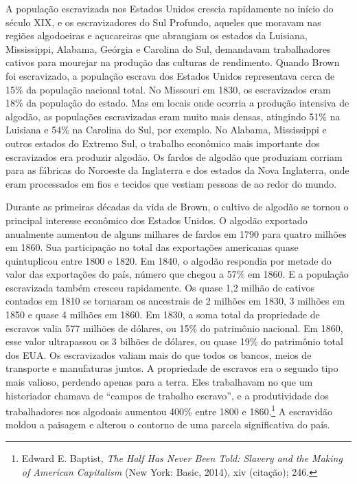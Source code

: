 A população escravizada nos Estados Unidos crescia rapidamente no início
do século XIX, e os escravizadores do Sul Profundo, aqueles que moravam
nas regiões algodoeiras e açucareiras que abrangiam os estados da
Luisiana, Mississippi, Alabama, Geórgia e Carolina do Sul, demandavam
trabalhadores cativos para mourejar na produção das culturas de
rendimento. Quando Brown foi escravizado, a população escrava dos
Estados Unidos representava cerca de 15\% da população nacional total.
No Missouri em 1830, os escravizados eram 18\% da população do estado.
Mas em locais onde ocorria a produção intensiva de algodão, as
populações escravizadas eram muito mais densas, atingindo 51\% na
Luisiana e 54\% na Carolina do Sul, por exemplo. No Alabama, Mississippi
e outros estados do Extremo Sul, o trabalho econômico mais importante
dos escravizados era produzir algodão. Os fardos de algodão que
produziam corriam para as fábricas do Noroeste da Inglaterra e dos
estados da Nova Inglaterra, onde eram processados em fios e tecidos que
vestiam pessoas de ao redor do mundo.

Durante as primeiras décadas da vida de Brown, o cultivo de algodão se
tornou o principal interesse econômico dos Estados Unidos. O algodão
exportado anualmente aumentou de alguns milhares de fardos em 1790 para
quatro milhões em 1860. Sua participação no total das exportações
americanas quase quintuplicou entre 1800 e 1820. Em 1840, o algodão
respondia por metade do valor das exportações do país, número que chegou
a 57\% em 1860. E a população escravizada também cresceu rapidamente. Os
quase 1,2 milhão de cativos contados em 1810 se tornaram os ancestrais
de 2 milhões em 1830, 3 milhões em 1850 e quase 4 milhões em 1860.
\protect\hypertarget{_Hlk21073862}{}{}Em 1830, a soma total da
propriedade de escravos valia 577 milhões de dólares, ou 15\% do
patrimônio nacional. Em 1860, esse valor ultrapassou os 3 bilhões de
dólares, ou quase 19\% do patrimônio total dos EUA.
\protect\hypertarget{_Hlk21073977}{}{}Os escravizados valiam mais do que
todos os bancos, meios de transporte e manufaturas juntos. A propriedade
de escravos era o segundo tipo mais valioso, perdendo apenas para a
terra. Eles trabalhavam no que um historiador chamava de ``campos de
trabalho escravo'', e a produtividade dos trabalhadores nos algodoais
aumentou 400\% entre 1800 e 1860.\footnote{Edward E. Baptist, \emph{The
  Half Has Never Been Told: Slavery and the Making of American
  Capitalism} (New York: Basic, 2014), xiv (citação); 246.} A escravidão
moldou a paisagem e alterou o contorno de uma parcela significativa do
país.

